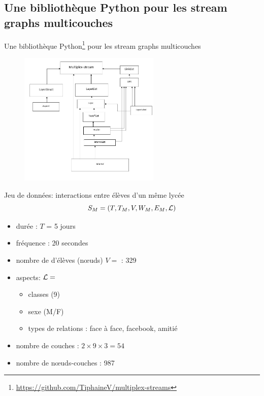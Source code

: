 \documentclass[15pt]{beamer}
\def \stgms {stream graphs multicouches}
\begin{document}
\subsection{Une bibliothèque Python pour les \stgms{}}


\begin{frame}{Une bibliothèque Python\footnote{\url{https://github.com/TiphaineV/multiplex-streams}} pour les \stgms{}}
    \begin{figure}
        \centering
        \includegraphics[width=0.6\textwidth]{img/codeStructure.JPG}
        \label{fig:my_label}
    \end{figure}
\end{frame}

\begin{frame}{Jeu de données: interactions entre élèves d'un même lycée}
    $$S_M=(T,T_M,V,W_M,E_M,{\cal L})$$
    \begin{itemize}
        \item durée : $T$ = 5 jours
        \item fréquence : 20 secondes
        \item nombre de d'élèves (n\oe{}uds) $V=$ : 329
        \item aspects: ${\cal L} =$ \begin{itemize}
            \item classes (9)
            \item sexe (M/F)
            \item types de relations : face à face, facebook, amitié
        \end{itemize}
        \item nombre de couches : $2\times 9 \times 3 = 54$
        \item nombre de n\oe{}uds-couches : 987
    \end{itemize}
\end{frame}
\end{document}
